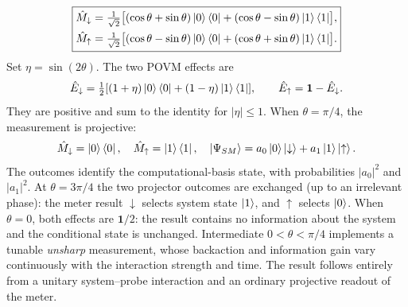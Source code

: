 \begin{equation}
\boxed{\begin{aligned}
\hat{M}_\downarrow&=\tfrac1{\sqrt2}\bigl[(\cos\theta+\sin\theta)\left|0\right\rangle\left\langle0\right|
  +(\cos\theta-\sin\theta)\left|1\right\rangle\left\langle1\right|\bigr],\\
\hat{M}_\uparrow&=\tfrac1{\sqrt2}\bigl[(\cos\theta-\sin\theta)\left|0\right\rangle\left\langle0\right|
  +(\cos\theta+\sin\theta)\left|1\right\rangle\left\langle1\right|\bigr].
\end{aligned}}
\end{equation}
Set $\eta=\sin(2\theta)$. The two POVM effects are
\begin{equation}
\hat{E}_\downarrow=\tfrac12[(1+\eta)\left|0\right\rangle\left\langle0\right|+(1-\eta)\left|1\right\rangle\left\langle1\right|],\qquad
\hat{E}_\uparrow=\mathbf1-\hat{E}_\downarrow.
\end{equation}
They are positive and sum to the identity for $|\eta|\le1$. When $\theta=\pi/4$, the measurement is projective:
\begin{equation}
\hat{M}_\downarrow=\left|0\right\rangle\left\langle0\right|,\quad
\hat{M}_\uparrow=\left|1\right\rangle\left\langle1\right|,\quad
\left|\Psi_{SM}\right\rangle=a_0\left|0\right\rangle\left|\downarrow\right\rangle+a_1\left|1\right\rangle\left|\uparrow\right\rangle.
\end{equation}
The outcomes identify the computational-basis state, with probabilities $|a_0|^2$ and $|a_1|^2$. At $\theta=3\pi/4$ the two projector outcomes are exchanged (up to an irrelevant phase): the meter result $\downarrow$ selects system state $\left|1\right\rangle$, and $\uparrow$ selects $\left|0\right\rangle$. When $\theta=0$, both effects are $\mathbf1/2$: the result contains no information about the system and the conditional state is unchanged. Intermediate $0<\theta<\pi/4$ implements a tunable \emph{unsharp} measurement, whose backaction and information gain vary continuously with the interaction strength and time. The result follows entirely from a unitary system--probe interaction and an ordinary projective readout of the meter.